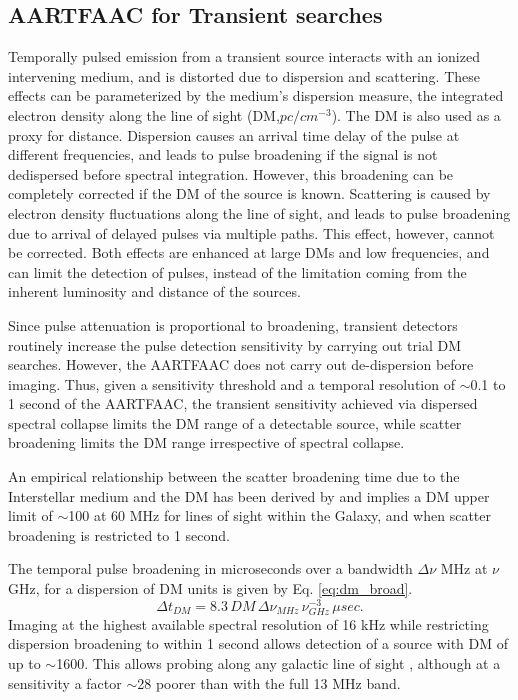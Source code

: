 \documentclass{aa}
\begin{document}
\subsection{\label{sub:AARTFAAC-for-Transient}AARTFAAC for Transient searches}

Temporally pulsed  emission from  a transient source  interacts with  an ionized
intervening medium,  and is  distorted due to  dispersion and  scattering. These
effects can be parameterized by  the medium's dispersion measure, the integrated
electron density along the line of  sight (DM,$pc/cm^{-3}$). The DM is also used
as a proxy for distance. Dispersion causes an arrival time delay of the pulse at
different  frequencies, and  leads  to pulse  broadening  if the  signal is  not
dedispersed  before  spectral  integration.  However,  this  broadening  can  be
completely corrected if  the DM of the source is known.  Scattering is caused by
electron  density  fluctuations along  the  line of  sight,  and leads to  pulse
broadening due  to arrival  of delayed pulses  via multiple paths.  This effect,
however, cannot  be corrected. Both  effects are enhanced  at large DMs  and low
frequencies, and  can limit the detection  of pulses, instead  of the limitation
coming from the inherent luminosity and distance of the sources.

Since  pulse  attenuation is  proportional  to  broadening, transient  detectors
routinely  increase the  pulse detection  sensitivity by  carrying out  trial DM
searches.   However,  the  AARTFAAC  does  not carry  out  de-dispersion  before
imaging.   Thus, given  a sensitivity  threshold  and a  temporal resolution  of
$\sim$0.1 to  1 second of the  AARTFAAC, the transient  sensitivity achieved via
dispersed spectral  collapse limits the DM  range of a  detectable source, while
scatter broadening limits the DM range irrespective of spectral collapse.

An  empirical  relationship between  the  scatter  broadening  time due  to  the
Interstellar     medium     and    the     DM     has     been    derived     by
\citet{bhat2004multifrequency} and implies  a DM upper limit of  $\sim$100 at 60
MHz  for lines  of  sight within  the  Galaxy, and  when  scatter broadening  is
restricted to 1 second.

The temporal pulse  broadening in microseconds over a  bandwidth $\Delta\nu$ MHz
at $\nu$ GHz, for a dispersion of DM units is given by Eq. \ref{eq:dm_broad}.
\begin{equation}
\Delta t_{DM}=8.3\,DM\,\Delta\nu_{MHz}\,\nu_{GHz}^{-3}\, \mu sec.\label{eq:dm_broad}
\end{equation}
Imaging at the highest available spectral resolution of 16 kHz while restricting
dispersion broadening to within 1 second allows detection of a source with DM of
up  to  $\sim$1600.   This allows  probing  along  any  galactic line  of  sight
\citep{cordes2002ne2001},  although at  a sensitivity  a factor  $\sim$28 poorer
than with the full 13 MHz band.
\end{document}
